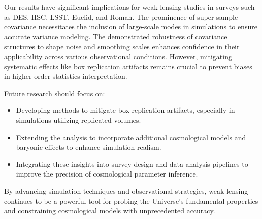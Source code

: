 Our results have significant implications for weak lensing studies in surveys such as DES, HSC, LSST, Euclid, and Roman. The prominence of super-sample covariance necessitates the inclusion of large-scale modes in simulations to ensure accurate variance modeling. The demonstrated robustness of covariance structures to shape noise and smoothing scales enhances confidence in their applicability across various observational conditions. However, mitigating systematic effects like box replication artifacts remains crucial to prevent biases in higher-order statistics interpretation.

Future research should focus on:
\begin{itemize}
    \item Developing methods to mitigate box replication artifacts, especially in simulations utilizing replicated volumes.
    \item Extending the analysis to incorporate additional cosmological models and baryonic effects to enhance simulation realism.
    \item Integrating these insights into survey design and data analysis pipelines to improve the precision of cosmological parameter inference.
\end{itemize}

By advancing simulation techniques and observational strategies, weak lensing continues to be a powerful tool for probing the Universe's fundamental properties and constraining cosmological models with unprecedented accuracy.